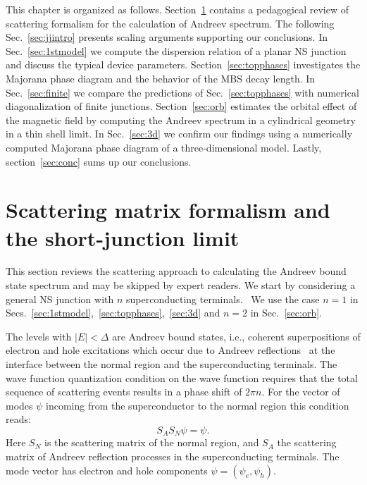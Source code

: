 This chapter is organized as follows.
Section~\ref{sec:formalism} contains a pedagogical review of scattering formalism for the calculation of Andreev spectrum.
The following Sec.~\ref{sec:jjintro} presents scaling arguments supporting our conclusions.
In Sec.~\ref{sec:1stmodel} we compute the dispersion relation of a planar NS junction and discuss the typical device parameters.
Section~\ref{sec:topphases} investigates the Majorana phase diagram and the behavior of the MBS decay length.
In Sec.~\ref{sec:finite} we compare the predictions of Sec.~\ref{sec:topphases} with numerical diagonalization of finite junctions.
Section~\ref{sec:orb} estimates the orbital effect of the magnetic field by computing the Andreev spectrum in a cylindrical geometry in a thin shell limit.
In Sec.~\ref{sec:3d} we confirm our findings using a numerically computed Majorana phase diagram of a three-dimensional model.
Lastly, section~\ref{sec:conc} sums up our conclusions.

\section{Scattering matrix formalism and the short-junction limit}
\label{sec:formalism}
This section reviews the scattering approach to calculating the Andreev bound state spectrum and may be skipped by expert readers.
We start by considering a general NS junction with $n$ superconducting terminals.~\cite{Heck2014}
We use the case $n=1$ in Secs.~\ref{sec:1stmodel},~\ref{sec:topphases},~\ref{sec:3d} and $n=2$ in Sec.~\ref{sec:orb}.

The levels with $|E|<\Delta$ are Andreev bound states, i.e., coherent superpositions of electron and hole excitations which occur due to Andreev reflections~\cite{Andreev1964} at the interface between the normal region and the superconducting terminals.
The wave function quantization condition on the wave function requires that the total sequence of scattering events results in a phase shift of $2\pi n$.
For the vector of modes $\psi$ incoming from the superconductor to the normal region this condition reads:
\begin{equation}\label{bound}
S_A S_N\psi=\psi.
\end{equation}
Here $S_N$ is the scattering matrix of the normal region, and $S_A$ the scattering matrix of Andreev reflection processes in the superconducting terminals.
The mode vector has electron and hole components $\psi=(\psi_e, \psi_h)$.


